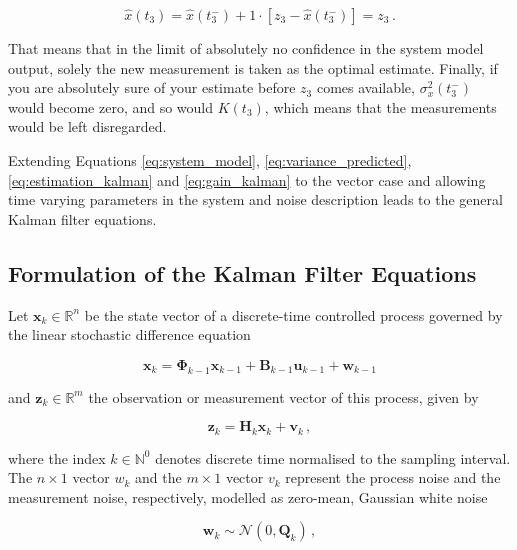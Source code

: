 \begin{equation}\label{eq:prediction_kalman}
  \hat{x}(t_3) = \hat{x}(t^-_3) + 1 \cdot [z_3-\hat{x}(t^-_3)] = z_3\,.
\end{equation}

\noindent
That means that in the limit of absolutely no confidence in the system model output, solely the new measurement is taken as the optimal estimate. Finally, if you are absolutely sure of your estimate before $z_3$ comes available, $\sigma^2_x(t^-_3)$ would become zero, and so would $K(t_3)$, which means that the measurements would be left disregarded. 

Extending Equations \ref{eq:system_model}, \ref{eq:variance_predicted}, \ref{eq:estimation_kalman} and \ref{eq:gain_kalman} to the vector case and allowing time varying parameters in the system and noise description leads to the general Kalman filter equations.

\subsection{Formulation of the Kalman Filter Equations} \label{sec:Kalman_equations}

Let $\mathbf{x}_k \in \mathbb{R}^n$ be the state vector of a discrete-time controlled process governed by the linear stochastic difference equation 

\begin{equation}\label{eq:time_dynamical_system_plant}
  \mathbf{x}_k = \bm{\Phi}_{k-1}\mathbf{x}_{k-1}+\mathbf{B}_{k-1}\mathbf{u}_{k-1}+\mathbf{w}_{k-1}
\end{equation}

\noindent
and $\mathbf{z}_k \in \mathbb{R}^m$ the observation or measurement vector of this process, given by

\begin{equation}\label{eq:time_dynamical_system_measurement}
  \mathbf{z}_k = \mathbf{H}_{k}\mathbf{x}_{k}+\mathbf{v}_{k}\,,
\end{equation}

\noindent
where the index $k \in \mathbb{N}^0$ denotes discrete time normalised to the sampling interval. The $n\times1$ vector $w_k$ and the $m\times1$ vector $v_k$ represent the process noise and the measurement noise, respectively, modelled as zero-mean, Gaussian white noise

\begin{equation}\label{eq:process_noise}
  \mathbf{w}_{k} \sim \mathcal{N}(0,\mathbf{Q}_k)\,,
\end{equation}

